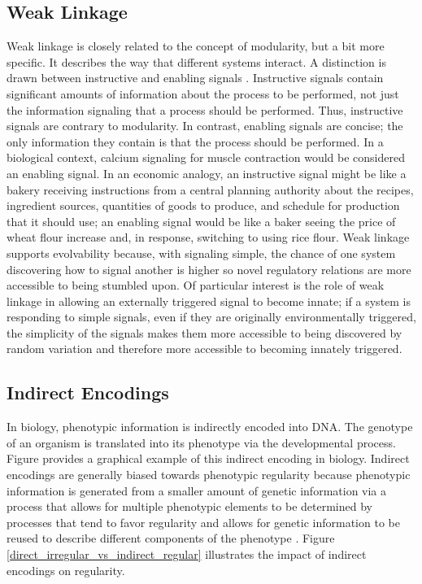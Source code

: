 \subsection{Weak Linkage}
Weak linkage is closely related to the concept of modularity, but a bit more specific. It describes the way that different systems interact. A distinction is drawn between instructive and enabling signals \cite[p 210]{Downing2015IntelligenceSystems}. Instructive signals contain significant amounts of information about the process to be performed, not just the information signaling that a process should be performed. Thus, instructive signals are contrary to modularity. In contrast, enabling signals are concise; the only information they contain is that the process should be performed. In a biological context, calcium signaling for muscle contraction would be considered an enabling signal. In an economic analogy, an instructive signal might be like a bakery receiving instructions from a central planning authority about the recipes, ingredient sources, quantities of goods to produce, and schedule for production that it should use; an enabling signal would be like a baker seeing the price of wheat flour increase and, in response, switching to using rice flour. Weak linkage supports evolvability because, with signaling simple, the chance of one system discovering how to signal another is higher so novel regulatory relations are more accessible to being stumbled upon. Of particular interest is the role of weak linkage in allowing an externally triggered signal to become innate; if a system is responding to simple signals, even if they are originally environmentally triggered, the simplicity of the signals makes them more accessible to being discovered by random variation and therefore more accessible to becoming innately triggered\cite[p 210]{Downing2015IntelligenceSystems}.

\subsection{Indirect Encodings}
In biology, phenotypic information is indirectly encoded into DNA. The genotype of an organism is translated into its phenotype via the developmental process. Figure  provides a graphical example of this indirect encoding in biology. Indirect encodings are generally biased towards phenotypic regularity because phenotypic information is generated from a smaller amount of genetic information via a process that allows for multiple phenotypic elements to be determined by processes that tend to favor regularity and allows for genetic information to be reused to describe different components of the phenotype \cite{Clune2011OnRegularity}. Figure \ref{direct_irregular_vs_indirect_regular} illustrates the impact of indirect encodings on regularity.

